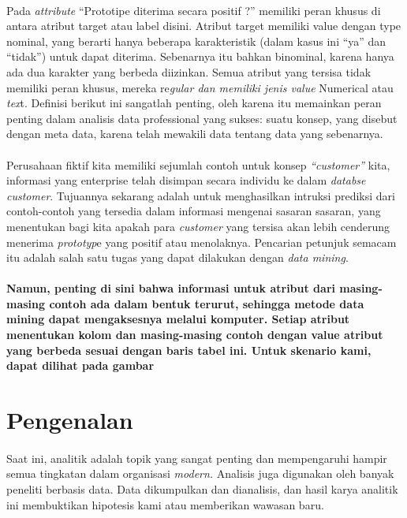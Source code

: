 \paragraph{}  Pada \textit{attribute} “Prototipe diterima secara positif ?” memiliki peran khusus di antara atribut target atau label disini. Atribut target memiliki value dengan type nominal, yang berarti hanya beberapa karakteristik (dalam kasus ini “ya” dan “tidak”) untuk dapat diterima. Sebenarnya itu bahkan binominal, karena hanya ada dua karakter yang berbeda diizinkan. Semua atribut yang tersisa tidak memiliki peran khusus, mereka re\textit{gular dan memiliki jenis value }Numerical atau\textit{ tex}t. Definisi berikut ini sangatlah penting, oleh karena itu memainkan peran penting dalam analisis data professional yang sukses: suatu konsep, yang disebut dengan meta data, karena telah mewakili data tentang data yang sebenarnya.

\paragraph{}  Perusahaan fiktif kita memiliki sejumlah contoh untuk konsep \textit{“customer”} kita, informasi yang enterprise telah disimpan secara individu ke dalam \textit{databse customer}. Tujuannya sekarang adalah untuk menghasilkan intruksi prediksi dari contoh-contoh yang tersedia dalam informasi mengenai sasaran sasaran, yang menentukan bagi kita apakah para \textit{customer} yang tersisa akan lebih cenderung menerima \textit{prototyp}e yang positif atau menolaknya. Pencarian petunjuk semacam itu adalah salah satu tugas yang dapat dilakukan dengan \textit{data mining}.

\paragraph{Namun, penting di sini bahwa informasi untuk atribut dari masing-masing contoh ada dalam bentuk terurut, sehingga metode data mining dapat mengaksesnya melalui komputer. Setiap atribut menentukan kolom dan masing-masing contoh dengan value atribut yang berbeda sesuai dengan baris tabel ini. Untuk skenario kami, dapat dilihat pada gambar}
 
\section{Pengenalan}

\paragraph{}  Saat ini, analitik adalah topik yang sangat penting dan mempengaruhi hampir semua tingkatan dalam organisasi \textit{modern.} Analisis juga digunakan oleh banyak peneliti berbasis data. Data dikumpulkan dan dianalisis, dan hasil karya analitik ini membuktikan hipotesis kami atau memberikan wawasan baru.

